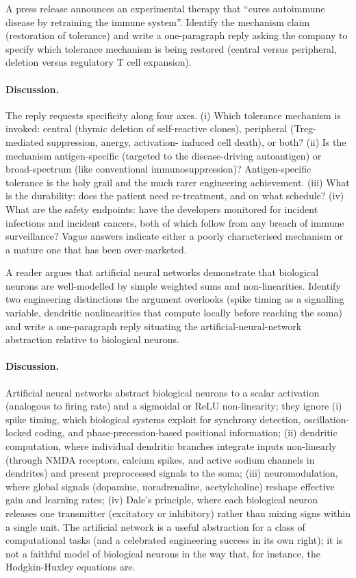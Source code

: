\begin{exercise}
A press release announces an experimental therapy that ``cures
autoimmune disease by retraining the immune system''. Identify the
mechanism claim (restoration of tolerance) and write a one-paragraph
reply asking the company to specify which tolerance mechanism is
being restored (central versus peripheral, deletion versus regulatory
T cell expansion).
\end{exercise}

\paragraph{Discussion.}
The reply requests specificity along four axes. (i) Which tolerance
mechanism is invoked: central (thymic deletion of self-reactive
clones), peripheral (Treg-mediated suppression, anergy, activation-
induced cell death), or both? (ii) Is the mechanism antigen-specific
(targeted to the disease-driving autoantigen) or broad-spectrum (like
conventional immunosuppression)? Antigen-specific tolerance is the
holy grail and the much rarer engineering achievement. (iii) What is
the durability: does the patient need re-treatment, and on what
schedule? (iv) What are the safety endpoints: have the developers
monitored for incident infections and incident cancers, both of which
follow from any breach of immune surveillance? Vague answers indicate
either a poorly characterised mechanism or a mature one that has
been over-marketed.

\begin{exercise}
A reader argues that artificial neural networks demonstrate that
biological neurons are well-modelled by simple weighted sums and
non-linearities. Identify two engineering distinctions the argument
overlooks (spike timing as a signalling variable, dendritic
nonlinearities that compute locally before reaching the soma) and
write a one-paragraph reply situating the artificial-neural-network
abstraction relative to biological neurons.
\end{exercise}

\paragraph{Discussion.}
Artificial neural networks abstract biological neurons to a scalar
activation (analogous to firing rate) and a sigmoidal or ReLU
non-linearity; they ignore (i) spike timing, which biological systems
exploit for synchrony detection, oscillation-locked coding, and
phase-precession-based positional information; (ii) dendritic
computation, where individual dendritic branches integrate inputs
non-linearly (through NMDA receptors, calcium spikes, and active
sodium channels in dendrites) and present preprocessed signals to the
soma; (iii) neuromodulation, where global signals (dopamine,
noradrenaline, acetylcholine) reshape effective gain and learning
rates; (iv) Dale's principle, where each biological neuron releases
one transmitter (excitatory or inhibitory) rather than mixing signs
within a single unit. The artificial network is a useful abstraction
for a class of computational tasks (and a celebrated engineering
success in its own right); it is not a faithful model of biological
neurons in the way that, for instance, the Hodgkin-Huxley equations
are.
